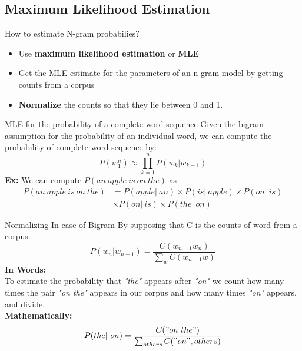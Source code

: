\documentclass{beamer}
\begin{document}
\subsection{Maximum Likelihood Estimation}
\begin{frame}{How to estimate N-gram probabilies?}
    \begin{itemize}
        \item Use \textbf{maximum likelihood estimation} or \textbf{MLE}
        \item Get the MLE estimate for the parameters of an n-gram model by getting counts from a corpus
        \item \textbf{Normalize} the counts so that they lie between 0 and 1.
    \end{itemize}
\end{frame}

\begin{frame}{MLE for the probability of a complete word sequence}
    Given the bigram assumption for the probability of an individual word, we can compute the probability of complete word sequence by:
    $$P(w_1^n) \approx \prod_{k=1}^nP(w_k|w_{k-1})$$
    \textbf{Ex:} We can compute $P(an\ apple\ is\ on\ the)$ as
    \begin{align*}
        P(an\ apple\ is\ on\ the) &= P(apple|\ an) \times P(is|\ apple) \times P(on|\ is)\\
                                  &\times P(on|\ is) \times P(the|\ on)
    \end{align*}

\end{frame}

\begin{frame}{Normalizing In case of Bigram}
By supposing that C is the counts of word from a corpus.
    $$P(w_n|w_{n-1}) = \frac{C(w_{n-1}w_n)}{\sum_{w}C(w_{n-1}w)}$$
    \textbf{In Words:}\\
    To estimate the probability that \textit{"the"} appears after \textit{"on"} we count how many times the pair \textit{"on the"} appears in our corpus and how many times \textit{"on"} appears, and divide.\\
    \textbf{Mathematically:}\\
    $$P(the|\ on) = \frac{C("on\ the")}{\sum_{others}C("on",others)}$$
\end{frame}
\end{document}
